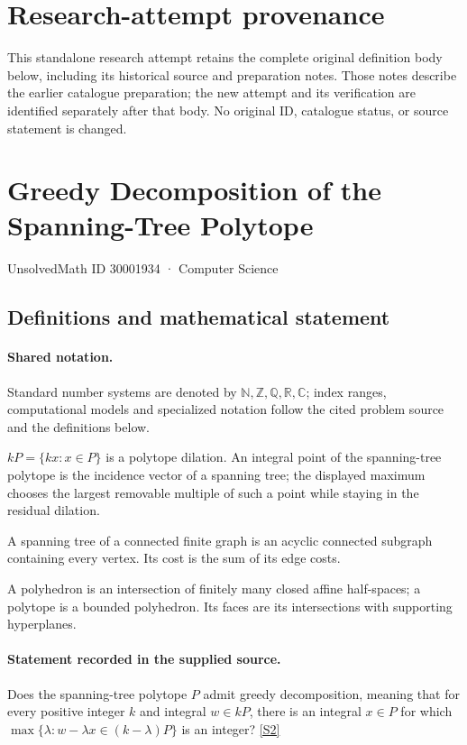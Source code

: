 \documentclass[11pt]{article}
\begin{document}
\section*{Research-attempt provenance}
This standalone research attempt retains the complete original definition body below,
including its historical source and preparation notes. Those notes describe the
earlier catalogue preparation; the new attempt and its verification are identified
separately after that body. No original ID, catalogue status, or source statement is changed.

\section{Greedy Decomposition of the Spanning-Tree Polytope}\label{30001934}
{\small UnsolvedMath ID 30001934 · Computer Science}
\subsection{Definitions and mathematical statement}

\paragraph{Shared notation.}Standard number systems are denoted by $\mathbb N,\mathbb Z,\mathbb Q,\mathbb R,\mathbb C$; index ranges, computational models and specialized notation follow the cited problem source and the definitions below.


$kP=\{kx:x\in P\}$ is a polytope dilation. An integral point of the spanning-tree polytope is the incidence vector of a spanning tree; the displayed maximum chooses the largest removable multiple of such a point while staying in the residual dilation.

A spanning tree of a connected finite graph is an acyclic connected subgraph containing every vertex. Its cost is the sum of its edge costs.

A polyhedron is an intersection of finitely many closed affine half-spaces; a polytope is a bounded polyhedron. Its faces are its intersections with supporting hyperplanes.
\paragraph{Statement recorded in the supplied source.}
Does the spanning-tree polytope $P$ admit greedy decomposition, meaning that for every positive integer $k$ and integral $w\in kP$, there is an integral $x\in P$ for which $\max\{\lambda:w-\lambda x\in(k-\lambda)P\}$ is an integer? \href{https://doi.org/10.4171/owr/2011/53}{[S2]}
\end{document}
